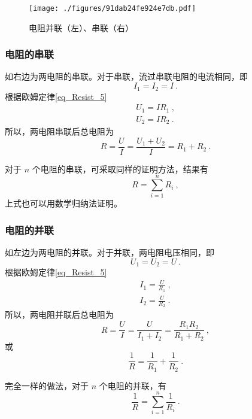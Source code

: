 
\begin{figure}[ht]
\centering
\texttt{[image: ./figures/91dab24fe924e7db.pdf]}
\caption{电阻并联（左）、串联（右）} \label{fig_Rcomb_1}
\end{figure}
\subsubsection{电阻的串联}
如右边为两电阻的串联。对于串联，流过串联电阻的电流相同，即
\begin{equation}
I_1=I_2=I~.
\end{equation}
根据欧姆定律\autoref{eq_Resist_5}~
\begin{equation}
\begin{aligned}
U_1=IR_1~,\\
U_2=IR_2~.
\end{aligned}
\end{equation}
所以，两电阻串联后总电阻为
\begin{equation}
R = \frac{U}{I}=\frac{U_1+U_2}{I} = {R_1 + R_2}~.
\end{equation}

对于 $n$ 个电阻的串联，可采取同样的证明方法，结果有
\begin{equation}\label{eq_Rcomb_1}
R=\sum_{i=1}^{n}R_i~,
\end{equation}
上式也可以用数学归纳法证明。
\subsubsection{电阻的并联}
如左边为两电阻的并联。对于并联，两电阻电压相同，即
\begin{equation}
U_1=U_2=U~.
\end{equation}
根据欧姆定律\autoref{eq_Resist_5}~
\begin{equation}
\begin{aligned}
I_1=\frac{U}{R_1}~,\\
I_2=\frac{U}{R_2}~.
\end{aligned}
\end{equation}
所以，两电阻并联后总电阻为
\begin{equation}
R = \frac{U}{I}=\frac{U}{I_1+I_2} =\frac{R_1R_2} {R_1 + R_2}~,
\end{equation}
或
\begin{equation}
\frac{1}{R} = \frac{1} {R_1}+\frac{1}{R_2}~.
\end{equation}

完全一样的做法，对于 $n$ 个电阻的并联，有
\begin{equation}\label{eq_Rcomb_2}
\frac{1}{R}=\sum_{i=1}^{n}\frac{1}{R_i}~.
\end{equation}
